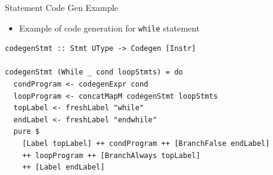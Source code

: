 \documentclass[dvipsnames,aspectratio=169]{beamer}
\begin{document}
\begin{frame}[fragile]{Statement Code Gen Example}

  \begin{itemize}
    \item Example of code generation for \texttt{while} statement
  \end{itemize}

\begin{verbatim}
codegenStmt :: Stmt UType -> Codegen [Instr]

codegenStmt (While _ cond loopStmts) = do
  condProgram <- codegenExpr cond
  loopProgram <- concatMapM codegenStmt loopStmts
  topLabel <- freshLabel "while"
  endLabel <- freshLabel "endwhile"
  pure $
    [Label topLabel] ++ condProgram ++ [BranchFalse endLabel]
    ++ loopProgram ++ [BranchAlways topLabel]
    ++ [Label endLabel]
\end{verbatim}

\end{frame}









\end{document}

